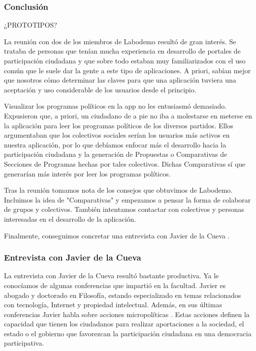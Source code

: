 \subsubsection{Conclusión}

¿PROTOTIPOS? 

La reunión con dos de los miembros de Labodemo resultó de gran interés. Se trataba de personas que tenían mucha experiencia en desarrollo de portales de participación ciudadana y que sobre todo estaban muy familiarizados con el uso común que le suele dar la gente a este tipo de aplicaciones. A priori, sabían mejor que nosotros cómo determinar las claves para que una aplicación tuviera una aceptación y uso considerable de los usuarios desde el principio.

Visualizar los programas políticos en la app no les entusiasmó demasiado. Expusieron que, a priori, un ciudadano de a pie no iba a molestarse en meterse en la aplicación para leer los programas políticos de los diversos partidos. Ellos argumentaban que los colectivos sociales serían los usuarios más activos en nuestra aplicación, por lo que debíamos enfocar más el desarrollo hacia la participación ciudadana y la generación de Propuestas o Comparativas de Secciones de Programas hechas por tales colectivos. Dichas Comparativas sí que generarían más interés por leer los programas políticos.

Tras la reunión tomamos nota de los consejos que obtuvimos de Labodemo. Incluimos la idea de "Comparativas" y empezamos a pensar la forma de colaborar de grupos y colectivos. También intentamos contactar con colectivos y personas interesadas en el desarrollo de la aplicación. 

Finalmente, conseguimos concretar una entrevista con Javier de la Cueva \cite{ref:jdelacueva}.

\subsubsection{Entrevista con Javier de la Cueva}

La entrevista con Javier de la Cueva resultó bastante productiva. Ya le conocíamos de algunas conferencias que impartió en la facultad. Javier es abogado y doctorado en Filosofía, estando especializado en temas relacionados con tecnología, Internet y propiedad intelectual. Además, en sus últimas conferencias Javier habla sobre acciones micropolíticas \cite{ref:manualCiberactivista}. Estas acciones definen la capacidad que tienen los ciudadanos para realizar aportaciones a la sociedad, el estado o el gobierno que favorezcan la participación ciudadana en una democracia participativa.

